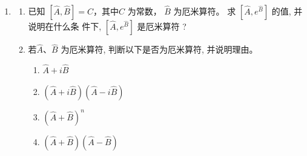 
\begin{enumerate}
	\item
\begin{enumerate}
	\item
 已知 $[\hat{A}, \hat{B}]=C$，其中$C  $ 为常数， $\hat{B}$ 为厄米算符。 求 $\left[\hat{A}, e^{\hat{B}}\right]$ 的值, 并说明在什么条 件下, $\left[\hat{A}, e^{\hat{B}}\right]$ 是厄米算符 ?
	

	
\item 
若$ \hat{A} $、$ \hat{B} $ 为厄米算符, 判断以下是否为厄米算符, 并说明理由。
\begin{enumerate}
	\item
	$\hat{A}+i \hat{B}$
	\item 
	$(\hat{A}+i \hat{B})(\hat{A}-i \hat{B})$
	\item 
	$(\hat{A}+\hat{B})^{n}$
	\item 
	$(\hat{A}+\hat{B})(\hat{A}-\hat{B})$
	
	
	
\end{enumerate}

	
\end{enumerate}


\end{enumerate}
